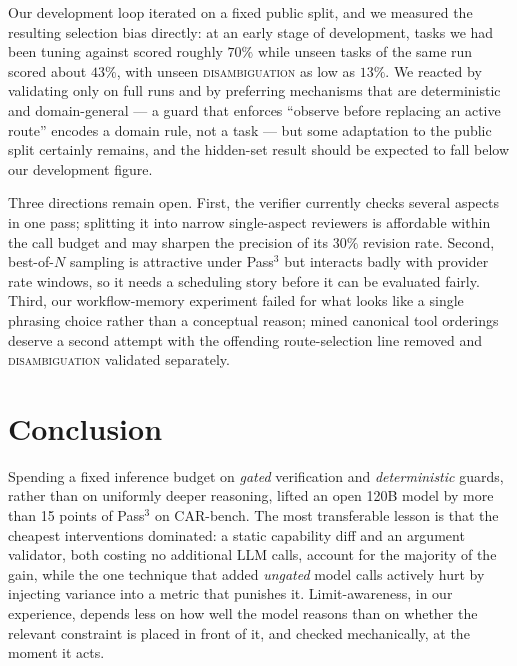 \documentclass{article}
\begin{document}
Our development loop iterated on a fixed public split, and we measured
the resulting selection bias directly: at an early stage of
development, tasks we had been tuning against scored roughly $70\%$
while unseen tasks of the same run scored about $43\%$, with unseen
\textsc{disambiguation} as low as $13\%$. We reacted by validating only
on full runs and by preferring mechanisms that are deterministic and
domain-general --- a guard that enforces ``observe before replacing an
active route'' encodes a domain rule, not a task --- but some
adaptation to the public split certainly remains, and the hidden-set
result should be expected to fall below our development figure.

Three directions remain open. First, the verifier currently checks
several aspects in one pass; splitting it into narrow single-aspect
reviewers is affordable within the call budget and may sharpen the
precision of its $30\%$ revision rate. Second, best-of-$N$
sampling is attractive under Pass$^3$ but interacts badly with
provider rate windows, so it needs a scheduling story before it can be
evaluated fairly. Third, our workflow-memory experiment failed for what
looks like a single phrasing choice rather than a conceptual reason;
mined canonical tool orderings deserve a second attempt with the
offending route-selection line removed and \textsc{disambiguation}
validated separately.

\section{Conclusion}

Spending a fixed inference budget on \emph{gated} verification and
\emph{deterministic} guards, rather than on uniformly deeper reasoning,
lifted an open 120B model by more than 15 points of Pass$^3$ on
CAR-bench. The most transferable lesson is that the cheapest
interventions dominated: a static capability diff and an argument
validator, both costing no additional LLM calls, account for the
majority of the gain, while the one technique that added
\emph{ungated} model calls actively hurt by injecting variance into a
metric that punishes it. Limit-awareness, in our experience, depends
less on how well the model reasons than on whether the relevant
constraint is placed in front of it, and checked mechanically, at the
moment it acts.
\end{document}
